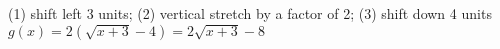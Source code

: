 {(1) shift left 3 units; (2) vertical stretch by a factor of 2; (3) shift down 4 units}
{ $g(x) = 2\left(\sqrt{x+3} - 4\right) = 2\sqrt{x+3} - 8$
}
